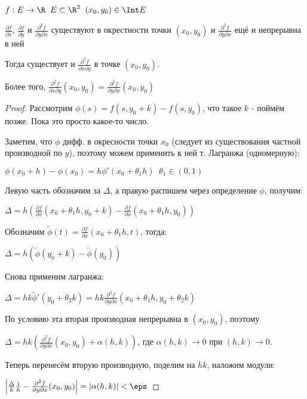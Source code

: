 \begin{theorem}\slashns
	
	$f: E \to \R \;\; E\subset \R^2 \;\; (x_0, y_0)  \in \Int E$
	
	$\frac{\partial f}{\partial x} $,
	$\frac{\partial f}{\partial y} $ и 
	$\frac{\partial^2 f}{\partial y \partial x} $ 
	существуют в окрестности точки $(x_0, y_0)$ и $\frac{\partial^2 f}{\partial y \partial x} $ ещё и непрерывна в ней
	
	
	Тогда существует и $\frac{\partial^2 f}{\partial x \partial y}$ в точке $(x_0, y_0)$. 

	Более того, $\frac{\partial^2 f}{\partial x \partial y}(x_0, y_0) = \frac{\partial^2 f}{\partial y \partial x}(x_0, y_0)$
\end{theorem}

\begin{proof}\slashns

	Рассмотрим $\phi(s) = f(s, y_0 + k) - f(s, y_0)$, что такое $k$ - поймём позже. Пока это просто какое-то число.

	Заметим, что $\phi$ дифф. в окресности точки $x_0$ (следует из существования частной производной по $y$), поэтому можем применить к ней т. Лагранжа (одномерную):
	
	$\phi(x_0 + h) - \phi(x_0) = h \phi'(x_0 + \theta_1 h) \;\; \theta_1 \in (0,1)$

	Левую часть обозначим за $\Delta$, а правую распишем через определение $\phi$, получим:

	$\Delta = h(\frac{\partial f}{\partial x} (x_0 + \theta_1 h, y_0 + k) - \frac{\partial f}{\partial x}(x_0 + \theta_1h, y_0)) $

	Обозначим $\tilde{\phi}(t) = \frac{\partial f}{\partial x} (x_0 + \theta_1 h, t)$, тогда:

	$\Delta = h(\tilde{\phi}(y_0+k) - \tilde{\phi}(y_0))$

	Снова применим лагранжа:

	$\Delta = hk\tilde{\phi}'(y_0 + \theta_2 k) = hk \frac{\partial^2 f}{\partial y \partial x} (x_0 + \theta_1 h, y_0 + \theta_2 k)$

	По условию эта вторая производная непрерывна в $(x_0, y_0)$, поэтому

	$\Delta = hk \left(\frac{\partial^2 f}{\partial y \partial x} (x_0, y_0 ) + \alpha(h, k)\right)$, где $\alpha(h, k)\to0$ при $(h,k)\to0$.
	
	Теперь перенесём вторую производную, поделим на $hk$, наложим модули:

	$\left|\frac{\Delta}{k}\frac{1}{h} - \frac{\partial^2 f}{\partial y \partial x} (x_0, y_0 )\right|=|\alpha(h, k)|<\eps$


\end{proof}
